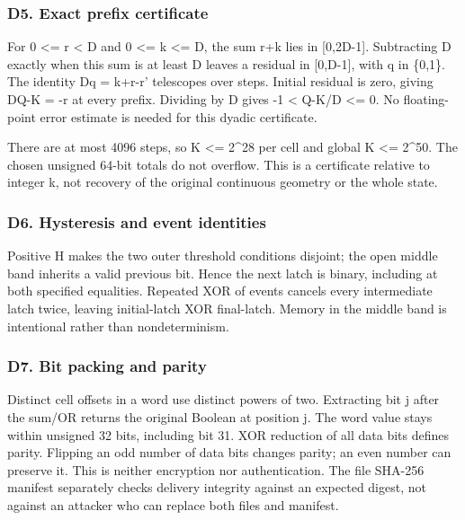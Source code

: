 \documentclass[11pt,a4paper]{article}
\begin{document}
\subsubsection{D5. Exact prefix certificate}\label{d5.-exact-prefix-certificate}

For 0 \textless= r \textless{} D and 0 \textless= k \textless= D, the sum r+k lies in {[}0,2D-1{]}. Subtracting D exactly when this sum is at least D leaves a residual in {[}0,D-1{]}, with q in \{0,1\}. The identity Dq = k+r-r' telescopes over steps. Initial residual is zero, giving DQ-K = -r at every prefix. Dividing by D gives -1 \textless{} Q-K/D \textless= 0. No floating-point error estimate is needed for this dyadic certificate.

There are at most 4096 steps, so K \textless= 2\^{}28 per cell and global K \textless= 2\^{}50. The chosen unsigned 64-bit totals do not overflow. This is a certificate relative to integer k, not recovery of the original continuous geometry or the whole state.

\subsubsection{D6. Hysteresis and event identities}\label{d6.-hysteresis-and-event-identities}

Positive H makes the two outer threshold conditions disjoint; the open middle band inherits a valid previous bit. Hence the next latch is binary, including at both specified equalities. Repeated XOR of events cancels every intermediate latch twice, leaving initial-latch XOR final-latch. Memory in the middle band is intentional rather than nondeterminism.

\subsubsection{D7. Bit packing and parity}\label{d7.-bit-packing-and-parity}

Distinct cell offsets in a word use distinct powers of two. Extracting bit j after the sum/OR returns the original Boolean at position j. The word value stays within unsigned 32 bits, including bit 31. XOR reduction of all data bits defines parity. Flipping an odd number of data bits changes parity; an even number can preserve it. This is neither encryption nor authentication. The file SHA-256 manifest separately checks delivery integrity against an expected digest, not against an attacker who can replace both files and manifest.
\end{document}
